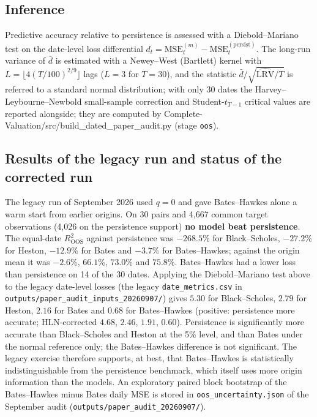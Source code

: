 \subsection{Inference}
\label{subsec:oos_inference}

Predictive accuracy relative to persistence is assessed with a
Diebold--Mariano test on the date-level loss differential
$d_t = \mathrm{MSE}^{(m)}_t - \mathrm{MSE}^{(\mathrm{persist})}_t$.  The
long-run variance of $\bar d$ is estimated with a Newey--West (Bartlett)
kernel with $L=\lfloor 4(T/100)^{2/9}\rfloor$ lags ($L=3$ for $T=30$), and the
statistic $\bar d/\sqrt{\widehat{\mathrm{LRV}}/T}$ is referred to a standard
normal distribution; with only 30 dates the Harvey--Leybourne--Newbold
small-sample correction and Student-$t_{T-1}$ critical values are reported
alongside; they are computed by Complete-Valuation/src/build\_dated\_paper\_audit.py (stage \texttt{oos}).

\subsection{Results of the legacy run and status of the corrected run}
\label{subsec:oos_results}

The legacy run of September 2026 used $q=0$ and gave Bates--Hawkes alone a
warm start from earlier origins.  On 30 pairs and 4{,}667 common target
observations (4{,}026 on the persistence support) \textbf{no model beat
persistence}.  The equal-date $R^2_{\mathrm{OOS}}$ against persistence was
$-268.5\%$ for Black--Scholes, $-27.2\%$ for Heston, $-12.9\%$ for Bates and
$-3.7\%$ for Bates--Hawkes; against the origin mean it was $-2.6\%$, $66.1\%$,
$73.0\%$ and $75.8\%$.  Bates--Hawkes had a lower loss than persistence on 14
of the 30 dates.  Applying the Diebold--Mariano test above to the legacy
date-level losses (the legacy \texttt{date\_metrics.csv} in
\texttt{outputs/paper\_audit\_inputs\_20260907/}) gives $5.30$ for Black--Scholes, $2.79$ for Heston, $2.16$ for Bates and $0.68$
for Bates--Hawkes (positive: persistence more accurate; HLN-corrected $4.68$,
$2.46$, $1.91$, $0.60$).  Persistence is significantly more accurate than
Black--Scholes and Heston at the 5\% level, and than Bates under the normal
reference only; the Bates--Hawkes difference is not significant.  The legacy
exercise therefore supports, at best, that Bates--Hawkes is statistically
indistinguishable from the persistence benchmark, which itself uses more
origin information than the models.  An exploratory paired block bootstrap of
the Bates--Hawkes minus Bates daily MSE is stored in
\texttt{oos\_uncertainty.json} of the September audit
(\texttt{outputs/paper\_audit\_20260907/}).

